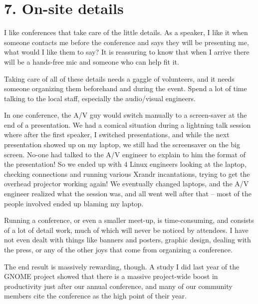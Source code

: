\section*{7. On-site details}

I like conferences that take care of the little details. As a speaker, I
like it when someone contacts me before the conference and says they will
be presenting me, what would I like them to say? It is reassuring to know
that when I arrive there will be a hands-free mic and someone who can
help fit it.

Taking care of all of these details needs a gaggle of volunteers, and it
needs someone organizing them beforehand and during the event. Spend a
lot of time talking to the local staff, especially the audio/visual
engineers.

In one conference, the A/V guy would switch manually to a screen-saver
at the end of a presentation. We had a comical situation during a
lightning talk session where after the first speaker, I switched
presentations, and while the next presentation showed up on my laptop,
we still had the screensaver on the big screen. No-one had talked to the
A/V engineer to explain to him the format of the presentation!
So we ended up with 4 Linux engineers looking at the laptop, checking
connections and running various Xrandr incantations, trying to get the
overhead projector working again! We eventually changed laptops, and the
A/V engineer realized what the session was, and all went well after that
-- most of the people involved ended up blaming my laptop.

Running a conference, or even a smaller meet-up, is time-consuming, and
consists of a lot of detail work, much of which will never be noticed by
attendees. I have not even dealt with things like banners and posters,
graphic design, dealing with the press, or any of the other joys that
come from organizing a conference.

The end result is massively rewarding, though. A study I did last year
of the GNOME project showed that there is a massive project-wide boost
in productivity just after our annual conference, and many of our
community members cite the conference as the high point of their year.

